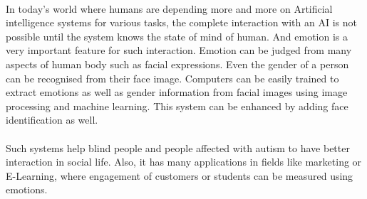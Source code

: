 \thispagestyle{empty}
\paragraph{} In today's world where humans are depending more and more on Artificial intelligence systems for various tasks, the complete interaction with an AI is not possible until the system knows the state of mind of human. And emotion is a very important feature for such interaction. Emotion can be judged from many aspects of human body such as facial expressions. Even the gender of a person can be recognised from their face image. Computers can be easily trained to extract emotions as well as gender information from facial images using image processing and machine learning. This system can be enhanced by adding face identification as well.
\paragraph{} Such systems help blind people and people affected with autism to have better interaction in social life. Also, it has many applications in fields like marketing or E-Learning, where engagement of customers or students can be measured using emotions.		
\newline
